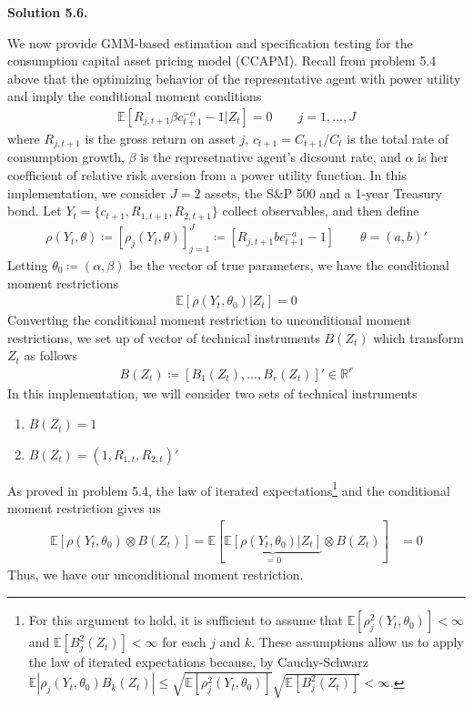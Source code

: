 \documentclass[11pt]{article}
\newenvironment{solution}[1]
    {\bigskip\noindent\textbf{Solution #1.} \par}
    {\medskip}
\newcommand{\ev}{\mathbb{E}}
\newcommand{\R}{\mathbb{R}}
\begin{document}
\begin{solution}{5.6}
We now provide GMM-based estimation and specification testing for the consumption capital asset pricing model (CCAPM). Recall from problem 5.4 above that the optimizing behavior of the representative agent with power utility and imply the conditional moment conditions 
\begin{align*}
    \ev\left[R_{j,t+1}\beta c_{t+1}^{-\alpha} - 1 | Z_t\right] = 0 \qquad j = 1, \ldots, J
\end{align*}
where $R_{j,t+1}$ is the gross return on asset $j$, $c_{t+1} = C_{t+1}/C_t$  is the total rate of consumption growth, $\beta$ is the represetnative agent's dicsount rate, and $\alpha$ is her coefficient of relative risk aversion from a power utility function. In this implementation, we consider $J=2$ assets, the S\&P 500 and a 1-year Treasury bond. Let $Y_t = \{c_{t+1}, R_{1, t+1}, R_{2,t+1} \}$ collect observables, and then define
\begin{align*}
    \rho(Y_t, \theta) \coloneq \left[\rho_j(Y_t,\theta) \right]_{j=1}^J \coloneq \left[R_{j,t+1}bc_{t+1}^{-a} - 1 \right] \qquad \theta = (a,b)'
\end{align*}
Letting $\theta_0 \coloneq(\alpha,\beta)$ be the vector of true parameters, we have the conditional moment restrictions
\begin{align*}
    \ev[\rho(Y_t,\theta_0) | Z_t] = 0
\end{align*}
Converting the conditional moment restriction to unconditional moment restrictions, we set up of vector of technical instruments $B(Z_t)$ which transform $Z_t$ as follows
\begin{align*}
    B(Z_t) \coloneq [B_1(Z_t), \ldots,B_r(Z_t)]' \in \R^r
\end{align*}
In this implementation, we will consider two sets of technical instruments
\begin{enumerate}[label=(\alph*),leftmargin=2cm]
    \item $B(Z_t) = 1$
    \item $B(Z_t) = (1,R_{1,t},R_{2,t})'$
\end{enumerate}
As proved in problem 5.4, the law of iterated expectations\footnote{For this argument to hold, it is sufficient to assume that $\ev[\rho_j^2(Y_t,\theta_0)] < \infty$ and $\ev[B_j^2(Z_t)] < \infty$ for each $j$ and $k$. These assumptions allow us to apply the law of iterated expectations because, by Cauchy-Schwarz $\ev | \rho_j(Y_t,\theta_0)B_k(Z_t)| \leq \sqrt{\ev[\rho_j^2(Y_t,\theta_0)]}\sqrt{\ev[B_j^2(Z_t)]} < \infty.$} and the conditional moment restriction gives us
\begin{align*}
    \ev\left[\rho(Y_t, \theta_0) \otimes B(Z_t) \right] 
    = \ev\left[ \underbrace{\ev\left[\rho(Y_t, \theta_0)|Z_t\right]}_{=0}   \otimes B(Z_t)\right] 
    &= 0
\end{align*}
Thus, we have our unconditional moment restriction.


\end{solution}
\end{document}
